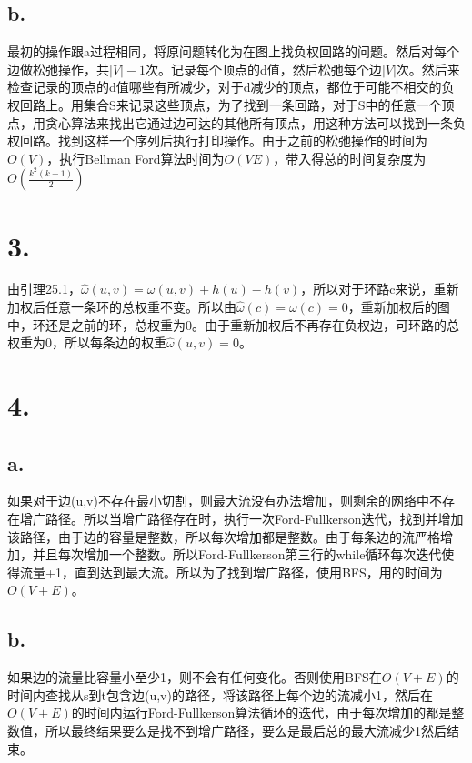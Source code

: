 \documentclass{article}
\begin{document}
	\subsection*{b.}
	\par{最初的操作跟a过程相同，将原问题转化为在图上找负权回路的问题。然后对每个边做松弛操作，共$|V|-1$次。记录每个顶点的d值，然后松弛每个边$|V|$次。然后来检查记录的顶点的d值哪些有所减少，对于d减少的顶点，都位于可能不相交的负权回路上。用集合S来记录这些顶点，为了找到一条回路，对于S中的任意一个顶点，用贪心算法来找出它通过边可达的其他所有顶点，用这种方法可以找到一条负权回路。找到这样一个序列后执行打印操作。由于之前的松弛操作的时间为$O(V)$，执行Bellman Ford算法时间为$O(VE)$，带入得总的时间复杂度为$O(\frac{k^{2}(k-1)}{2})$}
	\section*{3.}
	\par{由引理25.1，$\hat{\omega}(u,v)=\omega(u,v)+h(u)-h(v)$，所以对于环路c来说，重新加权后任意一条环的总权重不变。所以由$\hat{\omega}(c)=\omega(c)=0$，重新加权后的图中，环还是之前的环，总权重为0。由于重新加权后不再存在负权边，可环路的总权重为0，所以每条边的权重$\hat{\omega}(u,v)=0$。}
	\section*{4.}
	\subsection*{a.}
	\par{如果对于边(u,v)不存在最小切割，则最大流没有办法增加，则剩余的网络中不存在增广路径。所以当增广路径存在时，执行一次Ford-Fullkerson迭代，找到并增加该路径，由于边的容量是整数，所以每次增加都是整数。由于每条边的流严格增加，并且每次增加一个整数。所以Ford-Fullkerson第三行的while循环每次迭代使得流量+1，直到达到最大流。所以为了找到增广路径，使用BFS，用的时间为$O(V+E)$。}
	\subsection*{b.}
	\par{如果边的流量比容量小至少1，则不会有任何变化。否则使用BFS在$O(V+E)$的时间内查找从s到t包含边(u,v)的路径，将该路径上每个边的流减小1，然后在$O(V+E)$的时间内运行Ford-Fullkerson算法循环的迭代，由于每次增加的都是整数值，所以最终结果要么是找不到增广路径，要么是最后总的最大流减少1然后结束。}
\end{document}
